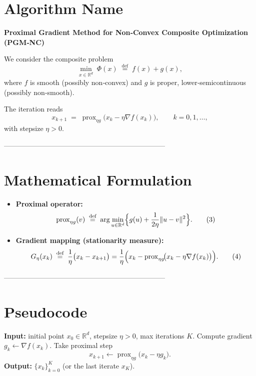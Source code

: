 \documentclass{article}
\begin{document}
\section*{Algorithm Name}
\textbf{Proximal Gradient Method for Non‑Convex Composite Optimization (PGM‑NC)}  

We consider the composite problem  
\[
\min_{x\in\mathbb{R}^d}\;\Phi(x)\;\stackrel{\text{def}}{=}\;f(x)+g(x),
\tag{1}
\]
where $f$ is smooth (possibly non‑convex) and $g$ is proper, lower‑semicontinuous (possibly non‑smooth).  

The iteration reads
\[
x_{k+1}\;=\;\operatorname{prox}_{\eta g}\!\bigl(x_k-\eta\nabla f(x_k)\bigr),
\qquad k=0,1,\dots,
\tag{2}
\]
with stepsize $\eta>0$.

---------------------------------------------------------------------

\section*{Mathematical Formulation}
\begin{itemize}
    \item \textbf{Proximal operator:}
    \[
    \operatorname{prox}_{\eta g}(v)\;\stackrel{\text{def}}{=}\;
    \arg\min_{u\in\mathbb{R}^d}\Bigl\{ g(u)+\frac{1}{2\eta}\|u-v\|^{2}\Bigr\}.
    \tag{3}
    \]
    \item \textbf{Gradient mapping (stationarity measure):}
    \[
    G_{\eta}(x_k)\;\stackrel{\text{def}}{=}\;\frac{1}{\eta}\bigl(x_k-x_{k+1}\bigr)
    =\frac{1}{\eta}\Bigl(x_k-\operatorname{prox}_{\eta g}\!\bigl(x_k-\eta\nabla f(x_k)\bigr)\Bigr).
    \tag{4}
    \]
\end{itemize}

---------------------------------------------------------------------

\section*{Pseudocode}
\begin{algorithm}[H]
\caption{Proximal Gradient Method for Non‑Convex Composite Optimization}
\begin{algorithmic}[1]
\State \textbf{Input:} initial point $x_0\in\mathbb{R}^d$, stepsize $\eta>0$, max iterations $K$.
    \State Compute gradient $g_k \gets \nabla f(x_k)$.
    \State Take proximal step 
    \[
    x_{k+1}\gets \operatorname{prox}_{\eta g}\bigl(x_k-\eta g_k\bigr).
    \]
\EndFor
\State \textbf{Output:} $\{x_k\}_{k=0}^K$ (or the last iterate $x_K$).
\end{algorithmic}
\end{algorithm}
\end{document}
